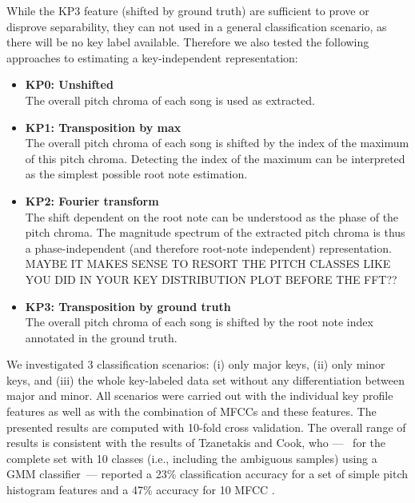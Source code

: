 \documentclass{article}
\begin{document}
While the KP3 feature (shifted by ground truth) are sufficient to prove or disprove separability, they can not used in a general classification scenario, as there will be no key label available. Therefore we also tested the following approaches to estimating a key-independent representation:
\begin{itemize}
    \item   \textbf{KP0: Unshifted}\\
        The overall pitch chroma of each song is used as extracted.
    \item   \textbf{KP1: Transposition by max}\\
        The overall pitch chroma of each song is shifted by the index of the maximum of this pitch chroma. Detecting the index of the maximum can be interpreted as the simplest possible root note estimation.
    \item   \textbf{KP2: Fourier transform}\\
        The shift dependent on the root note can be understood as the phase of the pitch chroma. The magnitude spectrum of the extracted pitch chroma is thus a phase-independent (and therefore root-note independent) representation. MAYBE IT MAKES SENSE TO RESORT THE PITCH CLASSES LIKE YOU DID IN YOUR KEY DISTRIBUTION PLOT BEFORE THE FFT?? %
    \item   \textbf{KP3: Transposition by ground truth}\\
        The overall pitch chroma of each song is shifted by the root note index annotated in the ground truth.
\end{itemize}

We investigated 3 classification scenarios: (i) only major keys, (ii) only minor keys, and (iii) the whole key-labeled data set without any differentiation between major and minor. All scenarios were carried out with the individual key profile features as well as with the combination of MFCCs and these features. The presented results are computed with 10-fold cross validation.
The overall range of results is consistent with the results of Tzanetakis and Cook, who ---~ for the complete set with 10 classes (i.e., including the ambiguous samples) using a GMM classifier~--- reported a 23\% classification accuracy for a set of simple pitch histogram features and a 47\% accuracy for 10 MFCC \cite{tzanetakis_musical_2002}. 
\end{document}
